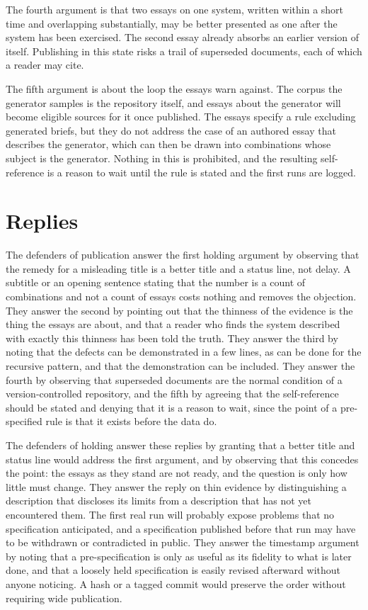\documentclass[11pt]{article}
\begin{document}
The fourth argument is that two essays on one system, written within a short time and overlapping substantially, may be better presented as one after the system has been exercised. The second essay already absorbs an earlier version of itself. Publishing in this state risks a trail of superseded documents, each of which a reader may cite.

The fifth argument is about the loop the essays warn against. The corpus the generator samples is the repository itself, and essays about the generator will become eligible sources for it once published. The essays specify a rule excluding generated briefs, but they do not address the case of an authored essay that describes the generator, which can then be drawn into combinations whose subject is the generator. Nothing in this is prohibited, and the resulting self-reference is a reason to wait until the rule is stated and the first runs are logged.

\section{Replies}

The defenders of publication answer the first holding argument by observing that the remedy for a misleading title is a better title and a status line, not delay. A subtitle or an opening sentence stating that the number is a count of combinations and not a count of essays costs nothing and removes the objection. They answer the second by pointing out that the thinness of the evidence is the thing the essays are about, and that a reader who finds the system described with exactly this thinness has been told the truth. They answer the third by noting that the defects can be demonstrated in a few lines, as can be done for the recursive pattern, and that the demonstration can be included. They answer the fourth by observing that superseded documents are the normal condition of a version-controlled repository, and the fifth by agreeing that the self-reference should be stated and denying that it is a reason to wait, since the point of a pre-specified rule is that it exists before the data do.

The defenders of holding answer these replies by granting that a better title and status line would address the first argument, and by observing that this concedes the point: the essays as they stand are not ready, and the question is only how little must change. They answer the reply on thin evidence by distinguishing a description that discloses its limits from a description that has not yet encountered them. The first real run will probably expose problems that no specification anticipated, and a specification published before that run may have to be withdrawn or contradicted in public. They answer the timestamp argument by noting that a pre-specification is only as useful as its fidelity to what is later done, and that a loosely held specification is easily revised afterward without anyone noticing. A hash or a tagged commit would preserve the order without requiring wide publication.
\end{document}
